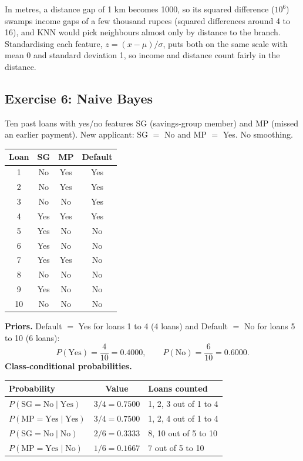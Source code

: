 In metres, a distance gap of 1 km becomes 1000, so its squared difference ($10^6$) swamps
income gaps of a few thousand rupees (squared differences around 4 to 16), and KNN would pick
neighbours almost only by distance to the branch. Standardising each feature,
$z = (x-\mu)/\sigma$, puts both on the same scale with mean 0 and standard deviation 1, so
income and distance count fairly in the distance.

\subsection{Exercise 6: Naive Bayes}
Ten past loans with yes/no features SG (savings-group member) and MP (missed an earlier payment).
New applicant: SG $=$ No and MP $=$ Yes. No smoothing.

\begin{table}[H]\centering\small
\begin{tabular}{cccc}\toprule
Loan & SG & MP & Default\\\midrule
1 & No & Yes & Yes\\ 2 & No & Yes & Yes\\ 3 & No & No & Yes\\ 4 & Yes & Yes & Yes\\
5 & Yes & No & No\\ 6 & Yes & No & No\\ 7 & Yes & Yes & No\\ 8 & No & No & No\\
9 & Yes & No & No\\ 10 & No & No & No\\\bottomrule
\end{tabular}\end{table}

\textbf{Priors.} Default $=$ Yes for loans 1 to 4 (4 loans) and Default $=$ No for loans 5 to 10 (6 loans):
\[
  P(\text{Yes}) = \frac{4}{10} = 0.4000, \qquad P(\text{No}) = \frac{6}{10} = 0.6000 .
\]
\textbf{Class-conditional probabilities.}

\begin{table}[H]\centering\small
\begin{tabular}{lcl}\toprule
Probability & Value & Loans counted\\\midrule
$P(\text{SG}=\text{No} \mid \text{Yes})$ & $3/4 = 0.7500$ & 1, 2, 3 out of 1 to 4\\
$P(\text{MP}=\text{Yes} \mid \text{Yes})$ & $3/4 = 0.7500$ & 1, 2, 4 out of 1 to 4\\
$P(\text{SG}=\text{No} \mid \text{No})$ & $2/6 = 0.3333$ & 8, 10 out of 5 to 10\\
$P(\text{MP}=\text{Yes} \mid \text{No})$ & $1/6 = 0.1667$ & 7 out of 5 to 10\\\bottomrule
\end{tabular}\end{table}


